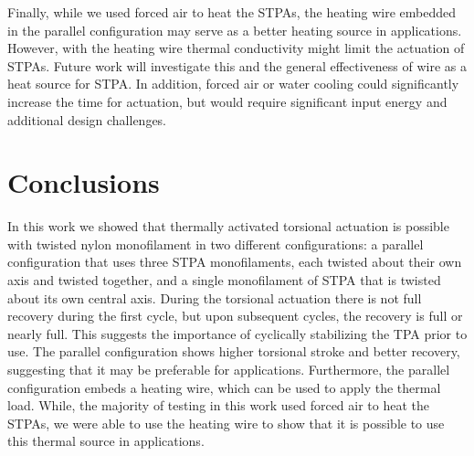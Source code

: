 \documentclass[twocolumn,10pt]{asme2e}
\begin{document}



Finally, while we used forced air to heat the STPAs, the heating wire embedded in the parallel configuration may serve as a better heating source in applications.   However, with the heating wire thermal conductivity might limit the actuation of STPAs.  Future work will investigate this and the general effectiveness of wire as a heat source for STPA.  %
 In addition, forced air or water cooling could significantly increase the time for actuation, but would require significant input energy and additional design challenges.


%	
%	
%	
%

\section{Conclusions}

In this work we showed that thermally activated torsional actuation is possible with twisted nylon monofilament in two different configurations: a parallel configuration that uses three STPA monofilaments, each twisted about their own axis and twisted together, and a single monofilament of STPA that is twisted about its own central axis.  During the torsional actuation there is not full recovery during the first cycle, but upon subsequent cycles, the recovery is full or nearly full.  This suggests the importance of cyclically stabilizing the TPA prior to use.  The parallel configuration shows higher torsional stroke and better recovery, suggesting that it may be preferable for applications.  Furthermore, the parallel configuration embeds a heating wire, which can be used to apply the thermal load.  While, the majority of testing in this work used forced air to heat the STPAs, we were able to use the heating wire to show that it is possible to use this thermal source in applications.  






\end{document}
